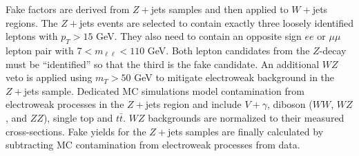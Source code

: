 \begin{table}[tb]
\caption{Requirements for ``identified'' and ``anti-identified'' electrons and muons.}
\label{tab:idantiid}
\end{table}
Fake factors are derived from $Z+$jets samples and then applied to $W+$jets regions. The $Z+$jets events are selected to contain exactly three loosely identified leptons with $p_T>15$ GeV. They also need to contain an opposite sign $ee$ or $\mu\mu$ lepton pair with 7$< m_{\ell\ell} < 110$ GeV. Both lepton candidates from the $Z$-decay must be ``identified'' so that the third is the fake candidate. An additional $WZ$ veto is applied using $m_T>50$ GeV to mitigate electroweak background in the $Z+$jets sample. Dedicated MC simulations model contamination from electroweak processes in the $Z+$jets region and include $V+\gamma$, diboson ($WW$, $WZ$, and $ZZ$), single top and $t\bar{t}$. $WZ$ backgrounds are normalized to their measured cross-sections. Fake yields for the $Z+$jets samples are finally calculated by subtracting MC contamination from electroweak processes from data. 

